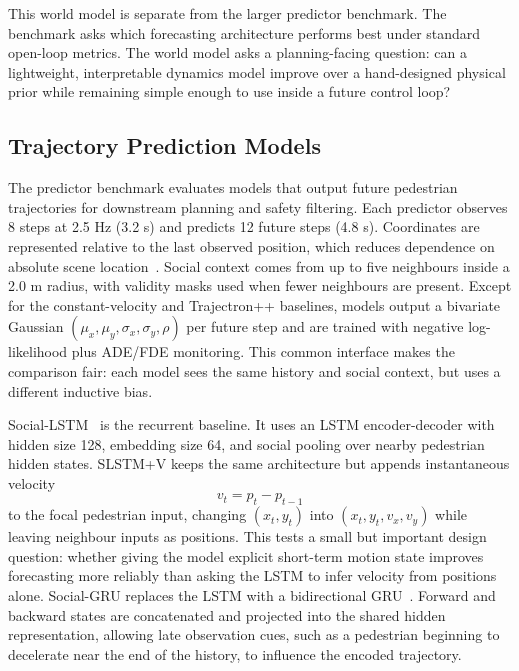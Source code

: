 \documentclass[conference]{IEEEtran}
\begin{document}
This world model is separate from the larger predictor
benchmark. The benchmark asks which forecasting architecture performs best under
standard open-loop metrics. The world model asks a planning-facing question:
can a lightweight, interpretable dynamics model improve over a hand-designed
physical prior while remaining simple enough to use inside a future control
loop?

\subsection{Trajectory Prediction Models}
\label{sec:tpm}

The predictor benchmark evaluates models that output future pedestrian
trajectories for downstream planning and safety filtering. Each predictor
observes 8 steps at 2.5 Hz (3.2 s) and predicts 12 future steps (4.8 s).
Coordinates are represented relative to the last observed position, which
reduces dependence on absolute scene location~\cite{alahi2016social}. Social
context comes from up to five neighbours inside a 2.0 m radius, with validity
masks used when fewer neighbours are present. Except for the constant-velocity
and Trajectron++ baselines, models output a bivariate Gaussian
$(\mu_x,\mu_y,\sigma_x,\sigma_y,\rho)$ per future step and are trained with
negative log-likelihood plus ADE/FDE monitoring. This common interface makes the
comparison fair: each model sees the same history and social context, but uses a
different inductive bias.

Social-LSTM~\cite{alahi2016social} is the recurrent baseline. It uses an
LSTM encoder-decoder with hidden size 128, embedding size 64, and social pooling
over nearby pedestrian hidden states. SLSTM+V keeps the same architecture but
appends instantaneous velocity
\begin{equation}
v_t=p_t-p_{t-1}
\end{equation}
to the focal pedestrian input, changing $(x_t,y_t)$ into
$(x_t,y_t,v_x,v_y)$ while leaving neighbour inputs as positions. This tests a
small but important design question: whether giving the model explicit
short-term motion state improves forecasting more reliably than asking the LSTM
to infer velocity from positions alone. Social-GRU replaces the LSTM with a
bidirectional GRU~\cite{cho2014learning,schuster1997bidirectional}. Forward and
backward states are concatenated and projected into the shared hidden
representation, allowing late observation cues, such as a pedestrian beginning
to decelerate near the end of the history, to influence the encoded trajectory.
\end{document}

